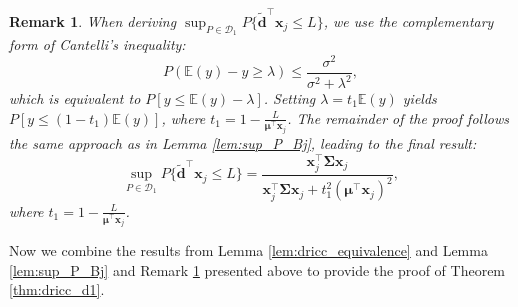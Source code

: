 \documentclass[preprint,12pt,authoryear]{elsarticle}
\newtheorem{remark}{Remark}
\begin{document}
\begin{remark}\label{rem:sup_P_Aj}
When deriving $\sup_{P \in \mathcal{D}_1} P \{\widetilde{\mathbf{d}}^\top \mathbf{x}_j \leqslant L\}$, we use the complementary form of Cantelli's inequality:
\begin{equation}
P(\mathbb{E}(y) - y \geqslant \lambda) \leqslant \frac{\sigma^2}{\sigma^2 + \lambda^2},
\end{equation}
which is equivalent to $P[y \leqslant \mathbb{E}(y) - \lambda]$. Setting $\lambda = t_1 \mathbb{E}(y)$ yields $P[y \leqslant (1 - t_1)\mathbb{E}(y)]$, where $t_1 = 1 - \frac{L}{\boldsymbol{\mu}^\top \mathbf{x}_j}$. The remainder of the proof follows the same approach as in Lemma \ref{lem:sup_P_Bj}, leading to the final result:
\begin{equation}
\sup_{P \in \mathcal{D}_1} P\{\widetilde{\mathbf{d}}^\top \mathbf{x}_j \leqslant L\} = \frac{\mathbf{x}_j^\top \boldsymbol{\Sigma} \mathbf{x}_j}{\mathbf{x}_j^\top \boldsymbol{\Sigma} \mathbf{x}_j + t_1^2 (\boldsymbol{\mu}^\top \mathbf{x}_j)^2},
\end{equation}
where $t_1 = 1 - \frac{L}{\boldsymbol{\mu}^\top \mathbf{x}_j}$.
\end{remark}

Now we combine the results from Lemma \ref{lem:dricc_equivalence} and Lemma \ref{lem:sup_P_Bj} and Remark \ref{rem:sup_P_Aj} presented above to provide the proof of Theorem \ref{thm:dricc_d1}.
\end{document}
